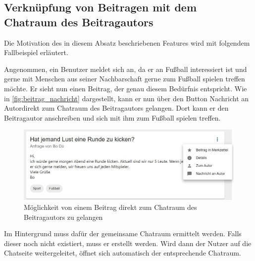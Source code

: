 \subsection{Verknüpfung von Beitragen mit dem Chatraum des Beitragautors}
\label{sec:beitrag_chat_verknüpfung}

Die Motivation des in diesem Absatz beschriebenen Features wird mit folgendem Fallbeispiel erläutert.

Angenommen, ein Benutzer meldet sich an, da er an Fußball interessiert ist und gerne mit Menschen aus seiner Nachbarschaft gerne zum Fußball spielen treffen möchte. Er sieht nun einen Beitrag, der genau diesem Bedürfnis entspricht. Wie in \autoref{fig:beitrag_nachricht} dargestellt, kann er nun über den Button \glqq Nachricht an Autor\grqq direkt zum Chatraum des Beitragautors gelangen. Dort kann er den Beitragautor anschreiben und sich mit ihm zum Fußball spielen treffen.

\begin{figure}[!htb]
  \centering
  \includegraphics[width=.7\textwidth]{figures/boas/21_beitrag_nachricht.jpg}
  \caption[]{Möglichkeit von einem Beitrag direkt zum Chatraum des Beitragautors zu gelangen}
  \label{fig:beitrag_nachricht}
\end{figure}

Im Hintergrund muss dafür der gemeinsame Chatraum ermittelt werden. Falls dieser noch nicht existiert, muss er erstellt werden. Wird dann der Nutzer auf die Chatseite weitergeleitet, öffnet sich automatisch der entsprechende Chatraum.
